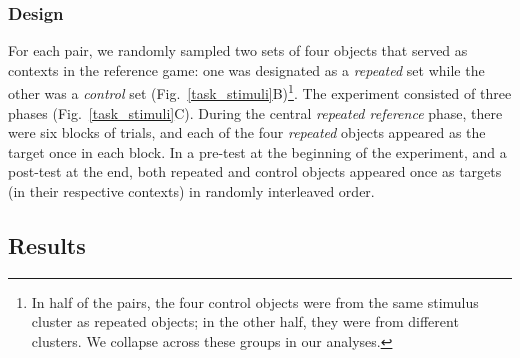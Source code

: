 \documentclass[10pt,letterpaper]{article}
\begin{document}


\subsubsection{Design}
For each pair, we randomly sampled two sets of four objects that served as contexts in the reference game: one was designated as a \emph{repeated} set while the other was a \emph{control} set (Fig.~\ref{task_stimuli}B)\footnote{In half of the pairs, the four control objects were from the same stimulus cluster as repeated objects; in the other half, they were from different clusters. We collapse across these groups in our analyses.}.%
The experiment consisted of three phases (Fig.~\ref{task_stimuli}C).
During the central \textit{repeated reference} phase, there were six blocks of trials, and each of the four \emph{repeated} objects appeared as the target once in each block.
In a pre-test at the beginning of the experiment, and a post-test at the end, both repeated and control objects appeared once as targets (in their respective contexts) in randomly interleaved order.

\subsection{Results}
\end{document}
